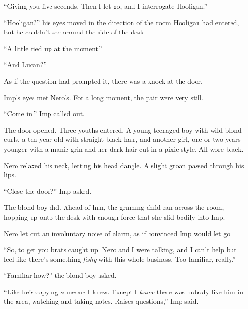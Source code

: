 ``Giving you five seconds.  Then I let go, and I interrogate Hooligan.''



``Hooligan?''  his eyes moved in the direction of the room Hooligan had entered, but he couldn't see around the side of the desk.



``A little tied up at the moment.''



``And Lucan?''



As if the question had prompted it, there was a knock at the door.



Imp's eyes met Nero's.  For a long moment, the pair were very still.



``Come in!'' Imp called out.



The door opened.  Three youths entered.  A young teenaged boy with wild blond curls, a ten year old with straight black hair, and another girl, one or two years younger with a manic grin and her dark hair cut in a pixie style.  All wore black.



Nero relaxed his neck, letting his head dangle.  A slight groan passed through his lips.



``Close the door?'' Imp asked.



The blond boy did.  Ahead of him, the grinning child ran across the room, hopping up onto the desk with enough force that she slid bodily into Imp.



Nero let out an involuntary noise of alarm, as if convinced Imp would let go.



``So, to get you brats caught up, Nero and I were talking, and I can't help but feel like there's something \emph{fishy} with this whole business.  Too familiar, really.''



``Familiar how?'' the blond boy asked.



``Like he's copying someone I knew.  Except I \emph{know} there was nobody like him in the area, watching and taking notes.  Raises questions,'' Imp said.



